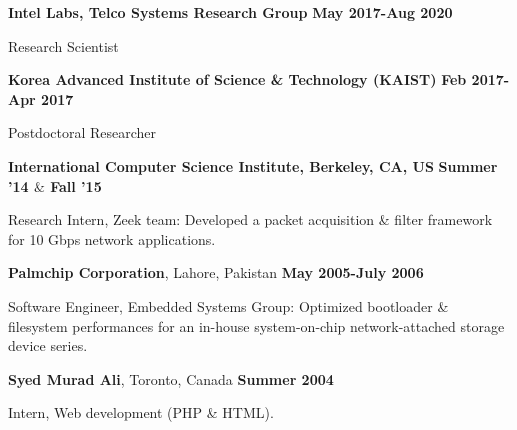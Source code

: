 \documentclass[10pt]{article}
\newenvironment{innerlist}[1][\enskip\textbullet]%
        {\begin{compactitem}[#1]}{\end{compactitem}}
\begin{document}
\textbf{Intel Labs, Telco Systems Research Group} \hfill \textbf{May 2017-Aug 2020}
\begin{innerlist}
\item {Research Scientist} \\
\end{innerlist}

\textbf{Korea Advanced Institute of Science \& Technology (KAIST)}  
				\hfill \textbf{Feb 2017-Apr 2017}
\begin{innerlist}
\item {Postdoctoral Researcher} \\
\end{innerlist}

\textbf{International Computer Science Institute, Berkeley, CA, US}  
				\hfill \textbf{Summer '14 $\&$ Fall '15}
\begin{innerlist}
\item {Research Intern, Zeek team: Developed a packet acquisition
\& filter framework for 10 Gbps network applications.} \\
\end{innerlist}

{\textbf{Palmchip Corporation}}, 
Lahore, Pakistan%
			\hfill {\bf May 2005-July 2006}
\begin{innerlist}
\item {Software Engineer, Embedded Systems Group: Optimized bootloader \& filesystem
performances for an in-house system-on-chip network-attached storage device series.} \\
\end{innerlist}

{\textbf{Syed Murad Ali}, Toronto, Canada}%
			\hfill {\bf Summer 2004}
\begin{innerlist}
\item {Intern, Web development (PHP \& HTML).}
\end{innerlist}
\end{document}
